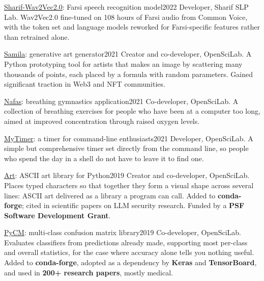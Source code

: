   \cventry
    {\href{https://huggingface.co/SLPL/Sharif-wav2vec2}{Sharif-Wav2Vec2.0}: Farsi speech recognition model}{2022}
    {Developer, Sharif SLP Lab. Wav2Vec2.0 fine-tuned on 108 hours of Farsi audio from Common Voice, with the token set and language models reworked for Farsi-specific features rather than retrained alone.}

  \cventry
    {\href{https://github.com/sepandhaghighi/samila}{Samila}: generative art generator}{2021}
    {Creator and co-developer, OpenSciLab. A Python prototyping tool for artists that makes an image by scattering many thousands of points, each placed by a formula with random parameters. Gained significant traction in Web3 and NFT communities.}

  \cventry
    {\href{https://github.com/sepandhaghighi/nafas}{Nafas}: breathing gymnastics application}{2021}
    {Co-developer, OpenSciLab. A collection of breathing exercises for people who have been at a computer too long, aimed at improved concentration through raised oxygen levels.}

  \cventry
    {\href{https://github.com/sepandhaghighi/mytimer}{MyTimer}: a timer for command-line enthusiasts}{2021}
    {Developer, OpenSciLab. A simple but comprehensive timer set directly from the command line, so people who spend the day in a shell do not have to leave it to find one.}

  \cventry
    {\href{https://github.com/sepandhaghighi/art}{Art}: ASCII art library for Python}{2019}
    {Creator and co-developer, OpenSciLab. Places typed characters so that together they form a visual shape across several lines: ASCII art delivered as a library a program can call. Added to \textbf{conda-forge}; cited in scientific papers on LLM security research. Funded by a \textbf{PSF Software Development Grant}.}

  \cventry
    {\href{https://github.com/sepandhaghighi/pycm}{PyCM}: multi-class confusion matrix library}{2019}
    {Co-developer, OpenSciLab. Evaluates classifiers from predictions already made, supporting most per-class and overall statistics, for the case where accuracy alone tells you nothing useful. Added to \textbf{conda-forge}, adopted as a dependency by \textbf{Keras} and \textbf{TensorBoard}, and used in \textbf{200+ research papers}, mostly medical.}

